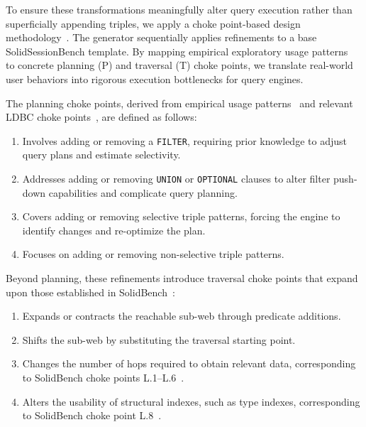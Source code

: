 To ensure these transformations meaningfully alter query execution 
rather than superficially appending triples, we apply a 
choke point-based design methodology~\cite{angles2014linked}. 
The generator sequentially applies refinements to a base 
SolidSessionBench template. By mapping empirical exploratory 
usage patterns~\cite{arenas2025exploring} to concrete 
planning (P) and traversal (T) choke points, we translate 
real-world user behaviors into rigorous execution bottlenecks 
for query engines.

The planning choke points, derived from empirical usage 
patterns~\cite{arenas2025exploring} and relevant LDBC 
choke points~\cite{angles2020ldbc}, are defined as follows:
\begin{enumerate}[label=\textbf{P.\arabic*}, leftmargin=*]
    \item Involves adding or 
    removing a \texttt{FILTER}, requiring prior knowledge 
    to adjust query plans and estimate selectivity.
    \item Addresses 
    adding or removing \texttt{UNION} or \texttt{OPTIONAL} 
    clauses to alter filter push-down capabilities and 
    complicate query planning.
    \item Covers adding 
    or removing selective triple patterns, forcing the engine 
    to identify changes and re-optimize the plan.
    \item Focuses 
    on adding or removing non-selective triple patterns.
\end{enumerate}

Beyond planning, these refinements introduce traversal 
choke points that expand upon those established in 
SolidBench~\cite{taelman2023link,taelman2023evaluation}:
\begin{enumerate}[label=\textbf{T.\arabic*}, leftmargin=*]
    \item Expands 
    or contracts the reachable sub-web through 
    predicate additions.
    \item Shifts the sub-web 
    by substituting the traversal starting point.
    \item Changes the number 
    of hops required to obtain relevant data, corresponding 
    to SolidBench choke points L.1--L.6~\cite{taelman2023evaluation}.
    \item Alters the usability of structural indexes, such as type indexes, 
    corresponding to SolidBench choke point 
    L.8~\cite{taelman2023evaluation}.
\end{enumerate}

